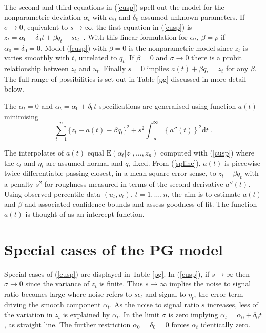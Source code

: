 \documentclass[authoryear]{elsarticle}
\newcommand{\E}{\mathrm{E}}
\newcommand{\eps}{\epsilon}
\newcommand{\de}{\mathrm{d}}
\newcommand{\eref}[1]{(\ref{#1})}
\newcommand{\tref}[1]{Table \ref{#1}}
\newcommand{\be}[1]{\begin{equation}\label{#1}}
\newcommand{\ee}{\end{equation}}
\begin{document}
The second and third equations in \eref{cusp} spell out the model for the nonparametric deviation  $\alpha_t$  with $\alpha_0$ and $\delta_0$ assumed unknown parameters.  If $\sigma\rightarrow 0$, equivalent to $s\rightarrow\infty$,  the first equation in \eref{cusp} is
$
z_t = \alpha_0+\delta_0 t + \beta q_t + s\eps_t
$\ .
With this linear formulation for $\alpha_t$,  $\beta=\rho$ if $\alpha_0=\delta_0=0$.    Model \eref{cusp} with  $\beta=0$ is the  nonparametric model since $z_t$ is varies smoothly with $t$, unrelated to $q_t$.  If $\beta=0$ and $\sigma\rightarrow 0$ there is a probit relationship between $z_t$ and $u_t$.  Finally $s=0$ implies $a(t)+\beta q_t=z_t$ for any $\beta$.   The full range of possibilities is set out in \tref{pg} discussed in more detail below.

The $\alpha_t=0$ and $\alpha_t=\alpha_0+\delta_0 t$ specifications are generalised using function $a(t)$ minimising
\be{spline}
 \sum_{t=1}^n\{z_t-a(t)-\beta q_t\}^2 + s^2\int_{-\infty}^{\infty} \left\{a''(t)\right\}^2\de t\ .
\ee

The interpolates of  $a(t)$ equal $\E(\alpha_t|z_1,\ldots,z_n)$ computed with \eref{cusp} where the $\eps_t$ and $\eta_t$ are assumed normal and $q_t$ fixed.
From \eref{spline},  $a(t)$ is piecewise twice differentiable passing closest, in a mean square error sense, to $z_t-\beta q_t$  with a penalty $s^2$ for  roughness measured in terms of the second derivative $a''(t)$.  Using observed percentile data $(u_t,v_t)$, $t=1,\ldots,n$, the aim is to estimate $a(t)$ and $\beta$ and associated confidence bounds and assess goodness of fit.   The function $a(t)$ is thought of as an intercept function.

\section{Special cases of the PG model}  

Special cases of  \eref{cusp}  are displayed in \tref{pg}.   In \eref{cusp}, if $s\rightarrow\infty$ then $\sigma\rightarrow 0$   since the variance of $z_t$ is finite.    Thus $s\rightarrow\infty$  implies the noise to signal ratio becomes large where noise refers to   $s\eps_t$ and signal to $\eta_t$, the error term driving  the smooth component $\alpha_t$.   As the noise to signal ratio $s$ increases, less of the variation in $z_t$ is explained by $\alpha_t$.  In the limit $\sigma$ is zero implying $\alpha_t=\alpha_0+\delta_0 t$, as straight line.   The further restriction $\alpha_0=\delta_0=0$ forces $\alpha_t$ identically zero.
\end{document}
